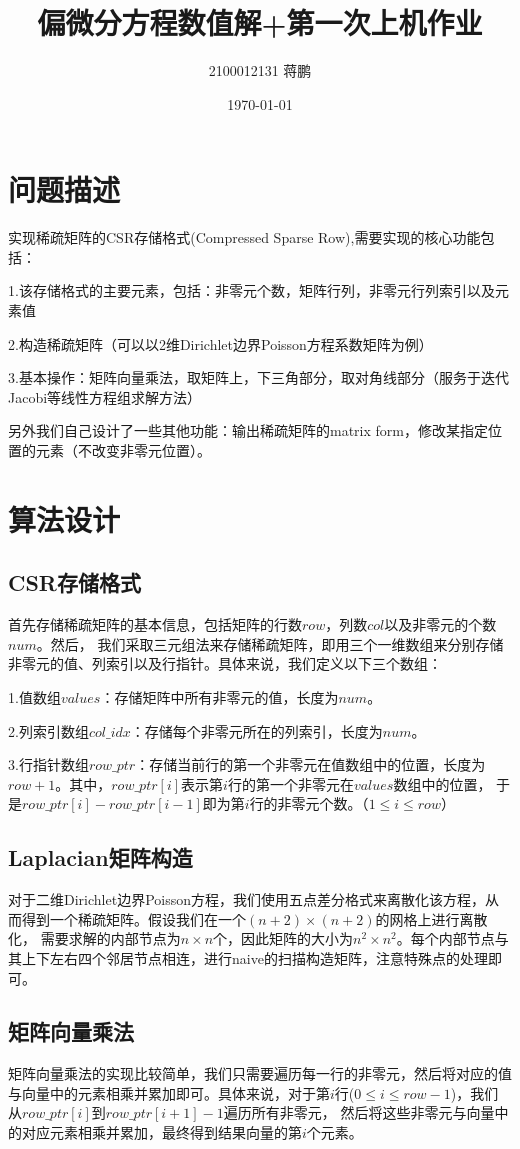 \documentclass[11pt,a4 paper,one side]{article}
\title{偏微分方程数值解+第一次上机作业}
\author{2100012131 蒋鹏}
\date{\today}
\begin{document}
\maketitle
\tableofcontents
\section{问题描述}
实现稀疏矩阵的CSR存储格式(Compressed Sparse Row),需要实现的核心功能包括：
\par 1.该存储格式的主要元素，包括：非零元个数，矩阵行列，非零元行列索引以及元素值
\par 2.构造稀疏矩阵（可以以2维Dirichlet边界Poisson方程系数矩阵为例）
\par 3.基本操作：矩阵向量乘法，取矩阵上，下三角部分，取对角线部分（服务于迭代Jacobi等线性方程组求解方法）
\par 另外我们自己设计了一些其他功能：输出稀疏矩阵的matrix form，修改某指定位置的元素（不改变非零元位置）。
\section{算法设计}
\subsection{CSR存储格式}
首先存储稀疏矩阵的基本信息，包括矩阵的行数$row$，列数$col$以及非零元的个数$num$。然后，
我们采取三元组法来存储稀疏矩阵，即用三个一维数组来分别存储非零元的值、列索引以及行指针。具体来说，我们定义以下三个数组：
\par 1.值数组$values$：存储矩阵中所有非零元的值，长度为$num$。
\par 2.列索引数组$col\_idx$：存储每个非零元所在的列索引，长度为$num$。
\par 3.行指针数组$row\_ptr$：存储当前行的第一个非零元在值数组中的位置，长度为$row+1$。其中，$row\_ptr[i]$表示第$i$行的第一个非零元在$values$数组中的位置，
于是$row\_ptr[i]-row\_ptr[i-1]$即为第$i$行的非零元个数。（$1\leq i \leq row$）
\subsection{Laplacian矩阵构造}
对于二维Dirichlet边界Poisson方程，我们使用五点差分格式来离散化该方程，从而得到一个稀疏矩阵。假设我们在一个$(n+2) \times (n+2)$的网格上进行离散化，
需要求解的内部节点为$n \times n$个，因此矩阵的大小为$n^2 \times n^2$。每个内部节点与其上下左右四个邻居节点相连，进行naive的扫描构造矩阵，注意特殊点的处理即可。
\subsection{矩阵向量乘法}
矩阵向量乘法的实现比较简单，我们只需要遍历每一行的非零元，然后将对应的值与向量中的元素相乘并累加即可。具体来说，对于第$i$行($0\leq i \leq row-1$)，我们从$row\_ptr[i]$到$row\_ptr[i+1]-1$遍历所有非零元，
然后将这些非零元与向量中的对应元素相乘并累加，最终得到结果向量的第$i$个元素。
\end{document}
